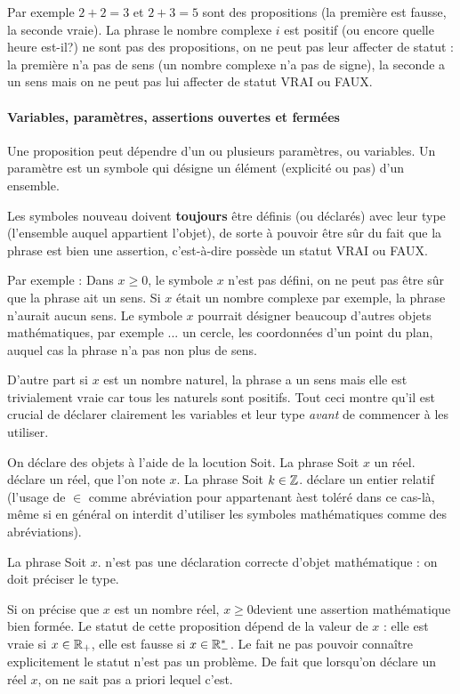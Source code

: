 Par exemple \og$2+2=3$\fg{} et \og $2+3=5$\fg{} sont des propositions (la première est fausse, la seconde vraie). La phrase \og le nombre complexe $i$ est positif\fg{} (ou encore \og quelle heure est-il?\fg) ne sont pas des propositions, on ne peut pas leur affecter de statut : la première n'a pas de sens (un nombre complexe n'a pas de signe), la seconde a un sens mais on ne peut pas lui affecter de statut VRAI ou FAUX.\\
 
 
\paragraph{Variables, paramètres, assertions ouvertes et fermées}


Une proposition peut dépendre d'un ou plusieurs paramètres, ou variables. Un paramètre est un symbole qui désigne un élément (explicité ou pas) d'un ensemble.

Les symboles nouveau doivent \textbf{toujours} être définis (ou déclarés) avec leur type (l'ensemble auquel appartient l'objet), de sorte à pouvoir être sûr du fait que la phrase est bien une assertion, c'est-à-dire possède un statut VRAI ou FAUX.

Par exemple : Dans \og$x\geq 0$\fg, le symbole $x$ n'est pas défini, on ne peut pas être sûr que la phrase ait un sens. Si $x$ était un nombre complexe par exemple, la phrase n'aurait aucun sens. Le symbole $x$ pourrait désigner beaucoup d'autres objets mathématiques, par exemple ... un cercle, les coordonnées d'un point du plan, auquel cas la phrase n'a pas non plus de sens.

 D'autre part si $x$ est un nombre naturel, la phrase a un sens mais elle est trivialement vraie car tous les naturels sont positifs. Tout ceci montre qu'il est crucial de déclarer clairement les variables et leur type \emph{avant} de commencer à les utiliser.

On déclare des objets à l'aide de la locution \og Soit\fg. La phrase \og Soit $x$ un réel.\fg{} déclare un réel, que l'on note $x$. La phrase \og Soit $k\in \mathbb{Z}$.\fg{} déclare un entier relatif (l'usage de $\in$ comme abréviation pour \og appartenant à\fg est toléré dans ce cas-là, même si en général on interdit d'utiliser les symboles mathématiques comme des abréviations).

La phrase \og Soit $x$.\fg{} n'est pas une déclaration correcte  d'objet mathématique : on doit préciser le type.

Si on précise que $x$ est un nombre réel, \og$x\geq 0$\fg devient une assertion mathématique bien formée. Le statut de cette proposition dépend de la valeur de $x$ : elle est vraie si $x\in \mathbb{R}_+$, elle est fausse si $x\in \mathbb{R}_-^*$. Le fait ne pas pouvoir connaître explicitement le statut n'est pas un problème. De fait que lorsqu'on déclare un réel $x$, on ne sait pas a priori lequel c'est.



